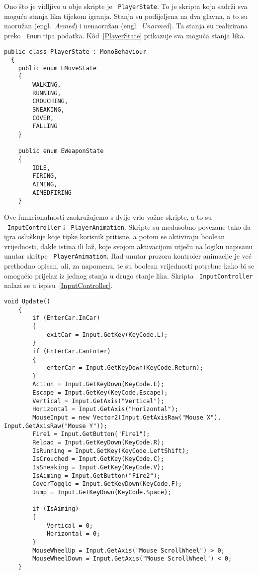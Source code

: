 Ono što je vidljivo u obje skripte je ~\texttt{PlayerState}. To je skripta koja sadrži sva
moguća stanja lika tijekom igranja. Stanja su podijeljena na dva glavna, a to su
naoružan (engl.~\textit{Armed}) i nenaoružan (engl.~\textit{Unarmed}). Ta stanja su
realizirana preko ~\texttt{Enum} tipa podatka. K\^od~\ref{PlayerState} prikazuje sva moguća
stanja lika.
\begin{lstlisting}[caption={Stanja lika}, label=PlayerState]
   public class PlayerState : MonoBehaviour
  {
    public enum EMoveState
    {
        WALKING,
        RUNNING,
        CROUCHING,
        SNEAKING,
        COVER,
        FALLING
    }

    public enum EWeaponState
    {
        IDLE,
        FIRING,
        AIMING,
        AIMEDFIRING
    }
\end{lstlisting}

Ove funkcionalnosti zaokružujemo s dvije vrlo važne skripte, a to su ~\texttt{InputController}
i ~\texttt{PlayerAnimation}. Skripte su međusobno povezane tako da igra osluškuje koje tipke
korisnik pritisne, a potom se aktiviraju boolean vrijednosti, dakle istina ili laž,
koje svojom aktivacijom utječu na logiku napisanu unutar skritpe ~\texttt{PlayerAnimation}.
Rad unutar prozora kontroler animacije je već prethodno opisan, ali, za napomenu, te
su boolean vrijednosti potrebne kako bi se omogućio prijelaz iz jednog stanja u
drugo stanje lika. Skripta ~\texttt{InputController} nalazi se u ispisu~\ref{InputController}.
\begin{lstlisting}[caption={Kontroler unosa korisnika}, label=InputController]
 void Update()
    {
        if (EnterCar.InCar)
        {
            exitCar = Input.GetKey(KeyCode.L);
        }
        if (EnterCar.CanEnter)
        {
            enterCar = Input.GetKeyDown(KeyCode.Return);
        }
        Action = Input.GetKeyDown(KeyCode.E);
        Escape = Input.GetKey(KeyCode.Escape);
        Vertical = Input.GetAxis("Vertical");
        Horizontal = Input.GetAxis("Horizontal");
        MouseInput = new Vector2(Input.GetAxisRaw("Mouse X"),
Input.GetAxisRaw("Mouse Y"));
        Fire1 = Input.GetButton("Fire1");
        Reload = Input.GetKeyDown(KeyCode.R);
        IsRunning = Input.GetKey(KeyCode.LeftShift);
        IsCrouched = Input.GetKey(KeyCode.C);
        IsSneaking = Input.GetKey(KeyCode.V);
        IsAiming = Input.GetButton("Fire2");
        CoverToggle = Input.GetKeyDown(KeyCode.F);
        Jump = Input.GetKeyDown(KeyCode.Space);

        if (IsAiming)
        {
            Vertical = 0;
            Horizontal = 0;
        }
        MouseWheelUp = Input.GetAxis("Mouse ScrollWheel") > 0;
        MouseWheelDown = Input.GetAxis("Mouse ScrollWheel") < 0;
    }
\end{lstlisting}

